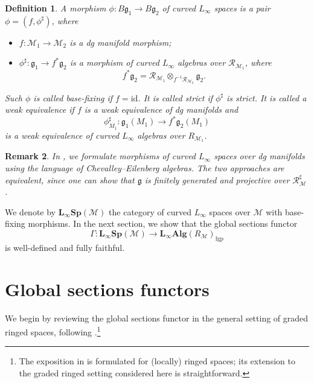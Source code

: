\documentclass[12pt]{amsart}
\newtheorem{defn}{Definition}[section]
\newtheorem{rmk}[defn]{Remark}
\numberwithin{equation}{section}
\theoremstyle{plain}
\newcommand{\fg}{\mathfrak{g}}
\newcommand{\sM}{\mathcal{M}}
\newcommand{\sR}{\mathcal{R}}
\newcommand{\id}{\mathrm{id}}
\begin{document}
	\begin{defn}
		A \emph{morphism} $\phi\colon B\fg_1 \to B\fg_2$ of curved $L_\infty$ spaces is a pair $\phi=(f, \phi^\sharp)$, where 
		\begin{itemize}
			\item $f\colon \sM_1 \rightarrow \sM_2$ is a dg manifold morphism;
			\item $\phi^\sharp\colon \fg_1 \rightarrow f^*\fg_2$ is a morphism of curved $L_\infty$ algebras over $\sR_{\sM_1}$, where
			\[
			f^*\fg_2 = \sR_{\sM_1} \otimes_{f^{-1} \sR_{\sM_2}} \fg_2.
			\]
		\end{itemize}
		
		Such $\phi$ is called \emph{base-fixing} if $f=\id$. It is called \emph{strict} if $\phi^\sharp$ is strict. It is called a \emph{weak equivalence} if $f$ is a weak equivalence of dg manifolds and
		\[
		\phi^\sharp_{M_1}\colon \fg_1(M_1) \rightarrow f^*\fg_2(M_1)
		\]
		is a weak equivalence of curved $L_\infty$ algebras over $R_{\sM_1}$.
	\end{defn}
	\begin{rmk}
		In \cite{cattaneojiang26}, we formulate morphisms of curved $L_\infty$ spaces over dg manifolds using the language of Chevalley--Eilenberg algebras. The two approaches are equivalent, since one can show that $\fg$ is finitely generated and projective over $\sR_\sM^\sharp$. 
	\end{rmk}
	
	We denote by $\mathbf{L_\infty Sp}(\sM)$ the category of curved $L_\infty$ spaces over $\sM$ with base-fixing morphisms. In the next section, we show that the global sections functor
	\[
	\Gamma\colon \mathbf{L_\infty Sp}(\sM) \longrightarrow \mathbf{L_\infty Alg}(R_\sM)_{\mathrm{fgp}}
	\]
	is well-defined and fully faithful.
	
	\section{Global sections functors}
	
	We begin by reviewing the global sections functor in the general setting of graded ringed spaces, following \cite{morye2013note}.\footnote{The exposition in \cite{morye2013note} is formulated for (locally) ringed spaces; its extension to the graded ringed setting considered here is straightforward.} 
	
\end{document}
